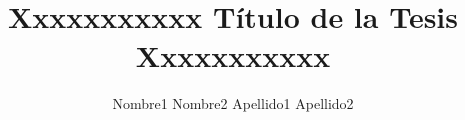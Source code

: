 
\renewcommand{\cftchappresnum}{CAPÍTULO }
\renewcommand{\cftchapaftersnum}{:}
\renewcommand{\cftchapnumwidth}{7em}

\renewcommand{\cftfigpresnum}{Figura N° }
\renewcommand{\cftfignumwidth}{6.85 em}

\renewcommand{\cfttabpresnum}{Tabla N° }
\renewcommand{\cfttabnumwidth}{6.5 em}


\usepackage{xcolor}

\renewcommand{\thechapter}{\Roman{chapter}}
\renewcommand{\theequation}{\arabic{chapter}.\arabic{equation}} 
\renewcommand{\thesection}{\arabic{chapter}.\arabic{section}}  
\renewcommand{\thetable}{\arabic{chapter}.\arabic{table}}  
\renewcommand{\thefigure}{\arabic{chapter}.\arabic{figure}}


\newtheorem{theorem}{Teorema}[chapter] 
\newtheorem{proposition}{Proposición}[chapter]

\newcommand{\R}{\mathbb{R}} %
\newcommand{\P}{\mathcal{P}} %



\author{Nombre1 Nombre2 Apellido1 Apellido2}


\title{Xxxxxxxxxxx Título de la Tesis Xxxxxxxxxxx}






